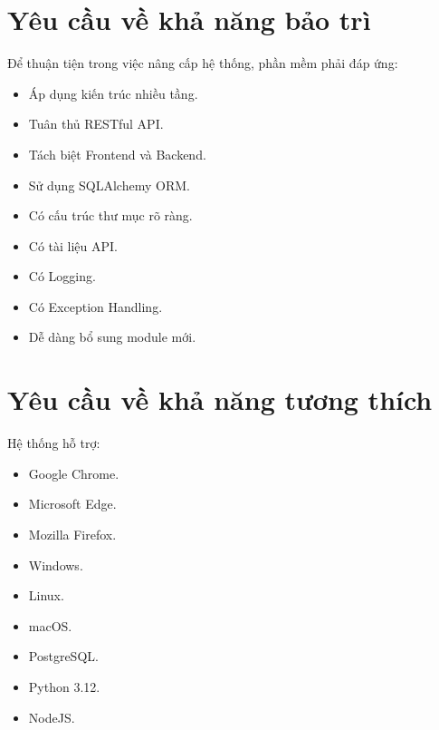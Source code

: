 
\section{Yêu cầu về khả năng bảo trì}

Để thuận tiện trong việc nâng cấp hệ thống, phần mềm phải đáp ứng:

\begin{itemize}

\item Áp dụng kiến trúc nhiều tầng.

\item Tuân thủ RESTful API.

\item Tách biệt Frontend và Backend.

\item Sử dụng SQLAlchemy ORM.

\item Có cấu trúc thư mục rõ ràng.

\item Có tài liệu API.

\item Có Logging.

\item Có Exception Handling.

\item Dễ dàng bổ sung module mới.

\end{itemize}


\section{Yêu cầu về khả năng tương thích}

Hệ thống hỗ trợ:

\begin{itemize}

\item Google Chrome.

\item Microsoft Edge.

\item Mozilla Firefox.

\item Windows.

\item Linux.

\item macOS.

\item PostgreSQL.

\item Python 3.12.

\item NodeJS.

\end{itemize}

